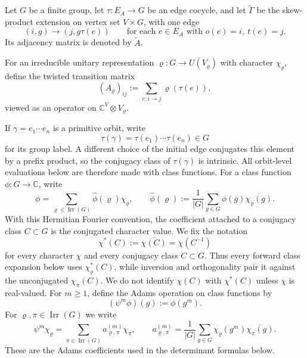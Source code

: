 \documentclass[11pt,a4paper]{amsart}
\theoremstyle{plain}
\theoremstyle{definition}
\theoremstyle{remark}
\DeclareMathOperator{\Irr}{Irr}
\newcommand{\CC}{\mathbb{C}}
\begin{document}
Let \(G\) be a finite group, let \(\tau:E_A\to G\) be an edge cocycle,
and let \(\widetilde\Gamma\) be the skew-product extension on vertex set
\(V\times G\), with one edge
\[
  (i,g)\longrightarrow (j,g\tau(e))
  \qquad \text{for each } e\in E_A \text{ with } o(e)=i,\ t(e)=j.
\]
Its adjacency matrix is denoted by \(\widetilde A\).

For an irreducible unitary representation
\(\varrho:G\to U(V_\varrho)\) with character \(\chi_\varrho\), define
the twisted transition matrix
\begin{equation}\label{eq:twisted-matrix-def}
  (A_\varrho)_{ij}:=\sum_{e:i\to j}\varrho(\tau(e)),
\end{equation}
viewed as an operator on \(\CC^V\otimes V_\varrho\).

If \(\gamma=e_1\cdots e_n\) is a primitive orbit, write
\[
  \tau(\gamma)=\tau(e_1)\cdots\tau(e_n)\in G
\]
for its group label. A different choice of the initial edge conjugates
this element by a prefix product, so the conjugacy class of
\(\tau(\gamma)\) is intrinsic. All orbit-level evaluations below are
therefore made with class functions. For a class function
\(\phi:G\to\CC\), write
\begin{equation}\label{eq:class-function-fourier}
  \phi
  =\sum_{\varrho\in\Irr(G)}\widehat\phi(\varrho)\chi_\varrho,
  \qquad
  \widehat\phi(\varrho)
  :=\frac{1}{|G|}\sum_{g\in G}\phi(g)\overline{\chi_\varrho(g)}.
\end{equation}
With this Hermitian Fourier convention, the coefficient attached to a
conjugacy class \(C\subset G\) is the conjugated character value. We
fix the notation
\[
  \chi^\ast(C):=\overline{\chi(C)}=\chi(C^{-1})
\]
for every character \(\chi\) and every conjugacy class \(C\subset G\).
Thus every forward class expansion below uses \(\chi_\varrho^\ast(C)\),
while inversion and orthogonality pair it against the unconjugated
\(\chi_\pi(C)\). We do not identify \(\chi(C)\) with \(\chi^\ast(C)\)
unless \(\chi\) is real-valued.
For \(m\ge 1\), define the Adams operation on class functions by
\begin{equation}\label{eq:adams-class-function}
  (\psi^m\phi)(g):=\phi(g^m).
\end{equation}
For \(\varrho,\pi\in\Irr(G)\) we write
\begin{equation}\label{eq:prelim-adams-character-coefficients}
  \psi^m\chi_\varrho
  =\sum_{\pi\in\Irr(G)}a_{\varrho,\pi}^{(m)}\chi_\pi,
  \qquad
  a_{\varrho,\pi}^{(m)}
  =\frac{1}{|G|}\sum_{g\in G}
    \chi_\varrho(g^m)\overline{\chi_\pi(g)} .
\end{equation}
These are the Adams coefficients used in the determinant formulas below.
\end{document}
